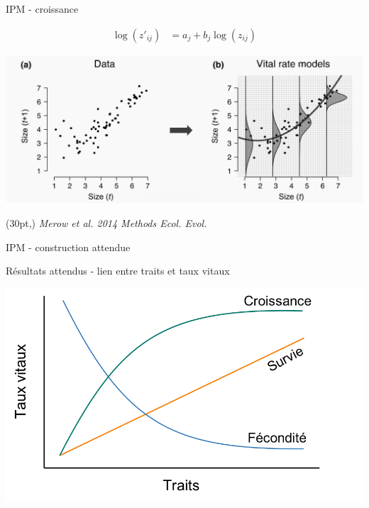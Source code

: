 \documentclass[11pt, compress, aspectratio=1610]{beamer}
\newcommand\smallcitation[1]{%
\begin{textblock*}{\textwidth}(30pt,\textheight)
	\raggedleft \footnotesize\textit{#1}
\end{textblock*}}
\begin{document}
\begin{frame}{IPM - croissance}
\protect\hypertarget{ipm---croissance}{}

\vspace*{-13mm}
\begin{align*}
  \log(z'_{ij}) &= a_{j} + b_{j}\log(z_{ij})
\end{align*}

\centering

\includegraphics[scale=0.46]{figures/Merow2014a.png}

\par

\smallcitation{Merow et al. 2014 Methods Ecol. Evol.}

\end{frame}

\begin{frame}{IPM - construction attendue}
\protect\hypertarget{ipm---construction-attendue}{}



\end{frame}

\begin{frame}{Résultats attendus - lien entre traits et taux vitaux}
\protect\hypertarget{ruxe9sultats-attendus---lien-entre-traits-et-taux-vitaux}{}

\centering

\includegraphics[scale=0.55]{figures/output_chap1.png}

\par

\end{frame}
\end{document}
